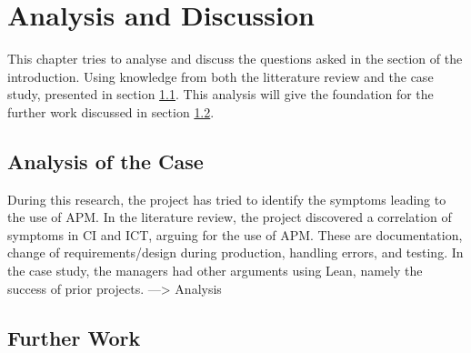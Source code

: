 
\chapter{Analysis and Discussion}
This chapter tries to analyse and discuss the questions asked in the  section of the introduction. Using knowledge from both the litterature review and the case study, presented in section \ref{sec:analysis}. This analysis will give the foundation for the further work discussed in section \ref{sec:further_work}. 
\section{Analysis of the Case} \label{sec:analysis}




During this research, the project has tried to identify the symptoms leading to the use of APM. In the literature review, the project discovered a correlation of symptoms in CI and ICT, arguing for the use of APM. These are documentation, change of requirements/design during production, handling errors, and testing. In the case study, the managers had other arguments using Lean, namely the success of prior projects. ---> Analysis
\section{Further Work} \label{sec:further_work}


\cleardoublepage